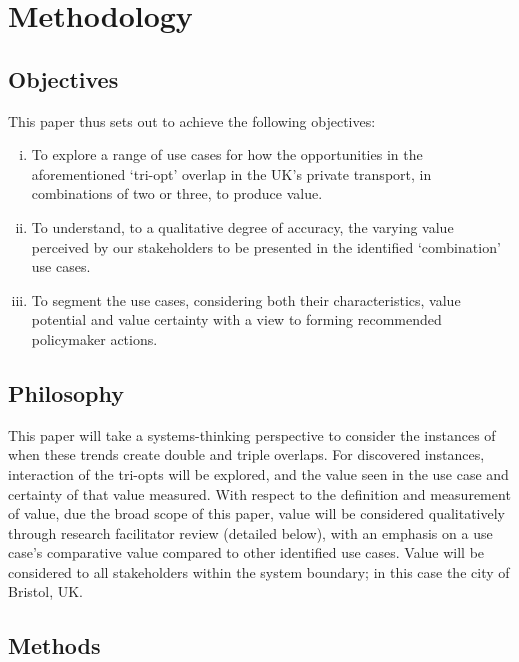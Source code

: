 \documentclass[b5paper,10pt]{article}
\begin{document}
\section{Methodology}\label{methodology}

\subsection{Objectives}

This paper thus sets out to achieve the following objectives:

\begin{enumerate}[i)]
\item To explore a range of use cases for how the opportunities in the
  aforementioned `tri-opt' overlap in the UK's private transport, in
  combinations of two or three, to produce value.  
\item To understand, to a qualitative degree of accuracy,
  the varying value perceived by our stakeholders to be presented in
  the identified `combination' use cases. 
\item To segment the use cases, considering both their
  characteristics, value potential and value certainty with a view to forming
  recommended policymaker actions.
\end{enumerate}

\subsection{Philosophy}

This paper will take a systems-thinking perspective to consider the
instances of when these trends create double and triple overlaps. For
discovered instances, interaction of the tri-opts will be explored,
and the value seen in the use case and certainty of that value
measured. With respect to the definition and measurement of value, due
the broad scope of this paper, value will be considered qualitatively
through research facilitator review (detailed below), with an emphasis
on a use case's comparative value compared to other identified use
cases. Value will be considered to all stakeholders within the system
boundary; in this case the city of Bristol, UK.

\subsection{Methods}
\end{document}
